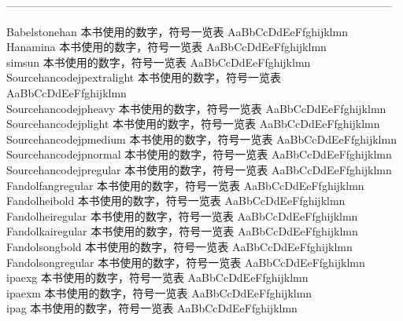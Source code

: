 ———————————————————————————————————

Babelstonehan {\cjk\mktsFontfileBabelstonehan{}本书使用的数字，符号一览表 AaBbCcDdEeFfghijklmn}\\
Hanamina {\cjk\mktsFontfileHanamina{}本书使用的数字，符号一览表 AaBbCcDdEeFfghijklmn}\\
simsun {\cjk\mktsFontfilesimsun{}本书使用的数字，符号一览表 AaBbCcDdEeFfghijklmn}\\
Sourcehancodejpextralight {\cjk\mktsFontfileSourcehancodejpextralight{}本书使用的数字，符号一览表 AaBbCcDdEeFfghijklmn}\\
Sourcehancodejpheavy {\cjk\mktsFontfileSourcehancodejpheavy{}本书使用的数字，符号一览表 AaBbCcDdEeFfghijklmn}\\
Sourcehancodejplight {\cjk\mktsFontfileSourcehancodejplight{}本书使用的数字，符号一览表 AaBbCcDdEeFfghijklmn}\\
Sourcehancodejpmedium {\cjk\mktsFontfileSourcehancodejpmedium{}本书使用的数字，符号一览表 AaBbCcDdEeFfghijklmn}\\
Sourcehancodejpnormal {\cjk\mktsFontfileSourcehancodejpnormal{}本书使用的数字，符号一览表 AaBbCcDdEeFfghijklmn}\\
Sourcehancodejpregular {\cjk\mktsFontfileSourcehancodejpregular{}本书使用的数字，符号一览表 AaBbCcDdEeFfghijklmn}\\
Fandolfangregular {\cjk\mktsFontfileFandolfangregular{}本书使用的数字，符号一览表 AaBbCcDdEeFfghijklmn}\\
Fandolheibold {\cjk\mktsFontfileFandolheibold{}本书使用的数字，符号一览表 AaBbCcDdEeFfghijklmn}\\
Fandolheiregular {\cjk\mktsFontfileFandolheiregular{}本书使用的数字，符号一览表 AaBbCcDdEeFfghijklmn}\\
Fandolkairegular {\cjk\mktsFontfileFandolkairegular{}本书使用的数字，符号一览表 AaBbCcDdEeFfghijklmn}\\
Fandolsongbold {\cjk\mktsFontfileFandolsongbold{}本书使用的数字，符号一览表 AaBbCcDdEeFfghijklmn}\\
Fandolsongregular {\cjk\mktsFontfileFandolsongregular{}本书使用的数字，符号一览表 AaBbCcDdEeFfghijklmn}\\
ipaexg {\cjk\mktsFontfileipaexg{}本书使用的数字，符号一览表 AaBbCcDdEeFfghijklmn}\\
ipaexm {\cjk\mktsFontfileipaexm{}本书使用的数字，符号一览表 AaBbCcDdEeFfghijklmn}\\
ipag {\cjk\mktsFontfileipag{}本书使用的数字，符号一览表 AaBbCcDdEeFfghijklmn}\\
